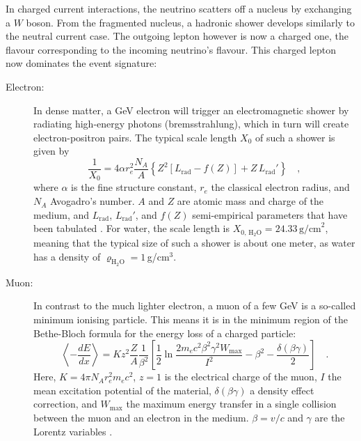 In charged current interactions, the neutrino scatters off a nucleus by
exchanging a $W$ boson. From the fragmented nucleus, a hadronic shower develops
similarly to the neutral current case. The outgoing lepton however is now a
charged one, the flavour corresponding to the incoming neutrino's flavour. This
charged lepton now dominates the event signature:

\begin{description}
 \item[Electron:] In dense matter, a GeV electron will trigger an
  electromagnetic shower by radiating high-energy photons (bremsstrahlung),
  which in turn will create electron-positron pairs. The typical scale length
  $X_0$ of such a shower is given by
  \begin{equation}
   \frac{1}{X_0} = 4\alpha r_e^2 \frac{N_A}{A}
                    \left\{ Z^2 \left[L_\mathrm{rad} - f(Z) \right]
                    + Z\,L_\mathrm{rad}'\right\} \quad,
   \label{eqn:rad_length}
  \end{equation}
  where $\alpha$ is the fine structure constant, $r_e$ the classical electron
  radius, and $N_A$ Avogadro's number. $A$ and $Z$ are atomic mass and charge
  of the medium, and $L_\mathrm{rad}$, $L_\mathrm{rad}'$, and $f(Z)$
  semi-empirical parameters that have been tabulated \cite{PDG, bremsstrahlung}.
  For water, the scale length is $X_\mathrm{0,\,H_2O} =
  24.33\,\mathrm{g/cm}^2$, meaning that the typical size of such a shower is
  about one meter, as water has a density of $\varrho_\mathrm{H_2O} =
  1$\,g/cm$^3$.
 \item[Muon:] In contrast to the much lighter electron, a muon of a few GeV is
  a so-called minimum ionising particle. This means it is in the minimum region
  of the Bethe-Bloch formula for the energy loss of a charged particle:
  \begin{equation}
   \left\langle -\frac{dE}{dx}\right\rangle = Kz^2\frac{Z}{A}\frac{1}{\beta^2}
      \left[ \frac{1}{2}\ln\frac{2m_ec^2\beta^2\gamma^2 W_\mathrm{max}}{I^2}
             - \beta^2 - \frac{\delta(\beta\gamma)}{2} \right] \quad.
   \label{eqn:bethe-bloch}
  \end{equation}
  Here, $K = 4\pi N_A r_e^2 m_ec^2$, $z=1$ is the electrical charge of the
  muon, $I$ the mean excitation potential of the material, $\delta(\beta\gamma)$
  a density effect correction, and $W_\mathrm{max}$  the maximum energy transfer
  in a single collision between the muon and an  electron in the medium.
  $\beta = v/c$ and $\gamma$ are the Lorentz variables \cite{PDG}.


\end{description}
